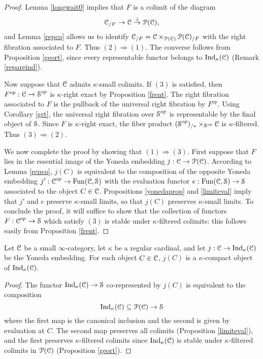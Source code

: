 \begin{proof}
Lemma \ref{longwait0} implies that $F$ is a colimit of the diagram
$$ \operatorname{\mathcal{C}}_{/F} \rightarrow \operatorname{\mathcal{C}} \stackrel{j}{\rightarrow} \operatorname{\mathcal{P}}(\operatorname{\mathcal{C}}),$$
and Lemma \ref{repco} allows us to identify $\operatorname{\mathcal{C}}_{/F} = \operatorname{\mathcal{C}} \times_{\operatorname{\mathcal{P}}(\operatorname{\mathcal{C}})} \operatorname{\mathcal{P}}(\operatorname{\mathcal{C}})_{/F}$ with the right fibration associated to $F$. Thus $(2) \Rightarrow (1)$. The converse follows from Proposition \ref{geort}, since every representable functor belongs to $\operatorname{Ind}_{\kappa}(\operatorname{\mathcal{C}})$ (Remark \ref{repareind}).

Now suppose that $\operatorname{\mathcal{C}}$ admits $\kappa$-small colimits. If $(3)$ is satisfied, then
$F^{op}: \operatorname{\mathcal{C}} \rightarrow \operatorname{\mathcal{S}}^{op}$ is $\kappa$-right exact by Proposition \ref{frent}. The right fibration associated to $F$ is the pullback of the universal right fibration by $F^{op}$. Using Corollary \ref{grt}, the universal right fibration over $\operatorname{\mathcal{S}}^{op}$ is representable by the final object of $\operatorname{\mathcal{S}}$. Since $F$ is $\kappa$-right exact, the fiber product
$(\operatorname{\mathcal{S}}^{op})_{/\ast} \times_{\operatorname{\mathcal{S}}^{op}} \operatorname{\mathcal{C}}$ is $\kappa$-filtered. Thus $(3) \Rightarrow (2)$.

We now complete the proof by showing that $(1) \Rightarrow (3)$. First suppose that
$F$ lies in the essential image of the Yoneda embedding $j: \operatorname{\mathcal{C}} \rightarrow \operatorname{\mathcal{P}}(\operatorname{\mathcal{C}})$. According to Lemma \ref{repco}, $j(C)$ is equivalent to the composition of the opposite Yoneda embedding $j': \operatorname{\mathcal{C}}^{op} \rightarrow \operatorname{Fun}(\operatorname{\mathcal{C}}, \operatorname{\mathcal{S}})$ with the evaluation functor
$e: \operatorname{Fun}(\operatorname{\mathcal{C}}, \operatorname{\mathcal{S}}) \rightarrow \operatorname{\mathcal{S}}$ associated to the object $C \in \operatorname{\mathcal{C}}$. Propositions \ref{yonedaprop} and \ref{limiteval} imply that $j'$ and $e$ preserve $\kappa$-small limits, so that $j(C)$ preserves $\kappa$-small limits. To conclude the proof, it will suffice to show that the collection of functors $F: \operatorname{\mathcal{C}}^{op} \rightarrow \operatorname{\mathcal{S}}$ which satisfy $(3)$ is stable under $\kappa$-filtered colimits: this follows easily from Proposition \ref{frent}.
\end{proof}

\begin{proposition}\label{justcut}
Let $\operatorname{\mathcal{C}}$ be a small $\infty$-category, let $\kappa$ be a regular cardinal, and let
$j: \operatorname{\mathcal{C}} \rightarrow \operatorname{Ind}_{\kappa}(\operatorname{\mathcal{C}})$ be the Yoneda embedding. For each object $C \in \operatorname{\mathcal{C}}$, $j(C)$ is a $\kappa$-compact object of $\operatorname{Ind}_{\kappa}(\operatorname{\mathcal{C}})$.
\end{proposition}

\begin{proof}
The functor $\operatorname{Ind}_{\kappa}(\operatorname{\mathcal{C}}) \rightarrow \operatorname{\mathcal{S}}$ co-represented by $j(C)$ is equivalent to the composition 
$$ \operatorname{Ind}_{\kappa}(\operatorname{\mathcal{C}}) \subseteq \operatorname{\mathcal{P}}(\operatorname{\mathcal{C}}) \rightarrow \operatorname{\mathcal{S}}$$
where the first map is the canonical inclusion and the second is given by evaluation at
$C$. The second map preserves all colimits (Proposition \ref{limiteval}), and the
first preserves $\kappa$-filtered colimits since $\operatorname{Ind}_{\kappa}(\operatorname{\mathcal{C}})$ is stable under
$\kappa$-filtered colimits in $\operatorname{\mathcal{P}}(\operatorname{\mathcal{C}})$ (Proposition \ref{geort}).
\end{proof}

